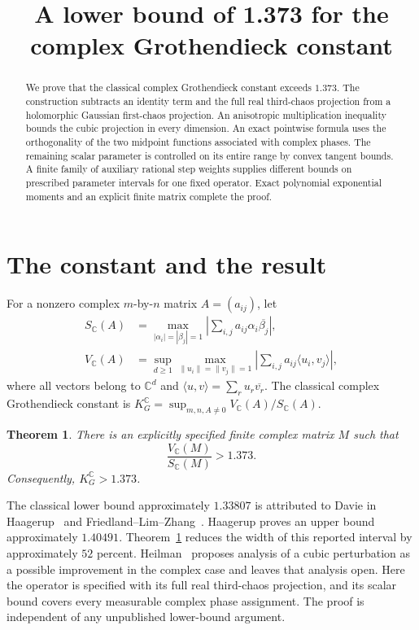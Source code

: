 \documentclass[11pt]{article}
\title{A lower bound of 1.373 for the complex Grothendieck constant}
\author{}
\date{}
\newtheorem{theorem}{Theorem}
\theoremstyle{remark}\newtheorem{remark}[theorem]{Remark}
\newcommand{\C}{\mathbb C}
\newcommand{\ip}[2]{\langle #1,#2\rangle}
\newcommand{\norm}[1]{\lVert #1\rVert}
\newcommand{\KG}{K_G^{\mathbb C}}
\begin{document}
\maketitle
\begin{abstract}
We prove that the classical complex Grothendieck constant exceeds
\(1.373\). The construction subtracts an identity term and the full
real third-chaos projection from a holomorphic Gaussian first-chaos
projection. An anisotropic multiplication inequality bounds the cubic
projection in every dimension. An exact pointwise formula uses the
orthogonality of the two midpoint functions associated with complex
phases. The remaining scalar parameter is controlled on its entire
range by convex tangent bounds. A finite family of auxiliary rational
step weights supplies different bounds on prescribed parameter intervals
for one fixed operator. Exact polynomial exponential moments and an
explicit finite matrix complete the proof.
\end{abstract}

\section{The constant and the result}

For a nonzero complex \(m\)-by-\(n\) matrix \(A=(a_{ij})\), let
\begin{align*}
 S_{\C}(A)&=\max_{|\alpha_i|=|\beta_j|=1}
 \left|\sum_{i,j}a_{ij}\alpha_i\overline{\beta_j}\right|,\\
 V_{\C}(A)&=\sup_{d\ge1}\max_{\norm{u_i}=\norm{v_j}=1}
 \left|\sum_{i,j}a_{ij}\ip{u_i}{v_j}\right|,
\end{align*}
where all vectors belong to \(\C^d\) and
\(\ip{u}{v}=\sum_r u_r\overline{v_r}\). The classical complex
Grothendieck constant is
\(\KG=\sup_{m,n,A\ne0}V_{\C}(A)/S_{\C}(A)\).

\begin{theorem}\label{thm:main}
There is an explicitly specified finite complex matrix \(M\) such that
\[
 \frac{V_{\C}(M)}{S_{\C}(M)}>1.373.
\]
Consequently, \(\KG>1.373\).
\end{theorem}

The classical lower bound approximately \(1.33807\) is attributed to
Davie in Haagerup~\cite{Haagerup} and Friedland--Lim--Zhang~\cite{FLZ}.
Haagerup proves an upper bound approximately \(1.40491\).
Theorem~\ref{thm:main} reduces the width of this reported interval by
approximately \(52\) percent. Heilman~\cite[Section 1.8]{Heilman}
proposes analysis of a cubic perturbation as a possible improvement in
the complex case and leaves that analysis open. Here the operator is
specified with its full real third-chaos projection, and its scalar bound
covers every measurable complex phase assignment. The proof is independent
of any unpublished lower-bound argument.
\end{document}

